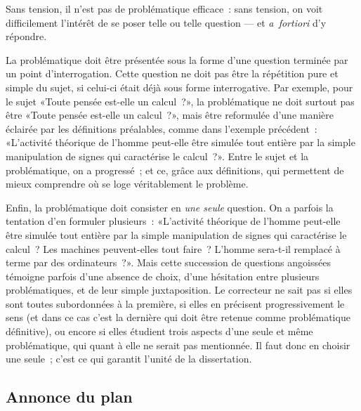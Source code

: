 \documentclass[a4paper,11pt]{article}
\begin{document}
Sans tension, il n'est pas de problématique efficace~: sans tension, on
voit difficilement l'intérêt de se poser telle ou telle question --- et
\emph{a~fortiori} d'y répondre. 

\par

La problématique doit être présentée sous la forme d'une question
terminée par un point d'interrogation.  Cette question ne doit pas être
la répétition pure et simple du sujet, si celui-ci était déjà sous forme
interrogative. Par exemple, pour le sujet «Toute pensée est-elle un
calcul~?», la problématique ne doit surtout pas être «Toute pensée
est-elle un calcul~?», mais être reformulée d'une manière éclairée par
les définitions préalables, comme dans l'exemple précédent~: «L'activité
théorique de l'homme peut-elle être simulée tout entière par la simple
manipulation de signes qui caractérise le calcul~?». Entre le sujet et
la problématique, on a progressé~; et ce, grâce aux définitions, qui
permettent de mieux comprendre où se loge véritablement le problème.

\par

Enfin, la problématique doit consister en \emph{une seule} question. On
a parfois la tentation d'en formuler plusieurs~: «L'activité théorique
de l'homme peut-elle être simulée tout entière par la simple
manipulation de signes qui caractérise le calcul~? Les machines
peuvent-elles tout faire~? L'homme sera-t-il remplacé à terme par des
ordinateurs~?». Mais cette succession de questions angoissées témoigne
parfois d'une absence de choix, d'une hésitation entre plusieurs
problématiques, et de leur simple juxtaposition. Le correcteur ne sait
pas si elles sont toutes subordonnées à la première, si elles en
précisent progressivement le sens (et dans ce cas c'est la dernière qui
doit être retenue comme problématique définitive), ou encore si elles
étudient trois aspects d'une seule et même problématique, qui quant à
elle ne serait pas mentionnée. Il faut donc en choisir une seule~; c'est
ce qui garantit l'unité de la dissertation.

\par








\subsection{Annonce du plan}
\end{document}
